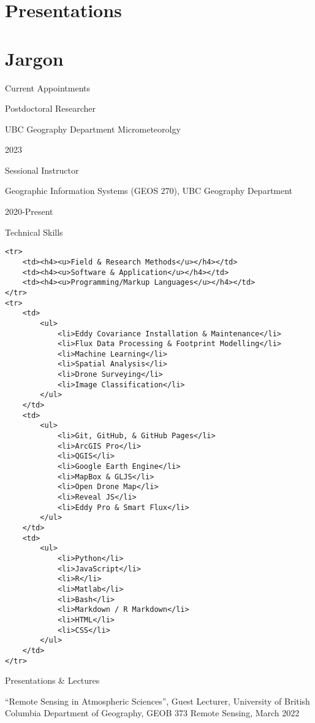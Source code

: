 \documentclass[
]{article}
\begin{document}
\hypertarget{presentations}{%
\section{Presentations}\label{presentations}}

\hypertarget{jargon}{%
\section{Jargon}\label{jargon}}

Current Appointments

Postdoctoral Researcher

UBC Geography Department Micrometeorolgy

2023

Sessional Instructor

Geographic Information Systems (GEOS 270), UBC Geography Department

2020-Present

Technical Skills

\begin{verbatim}
<tr>
    <td><h4><u>Field & Research Methods</u></h4></td>
    <td><h4><u>Software & Application</u></h4></td>
    <td><h4><u>Programming/Markup Languages</u></h4></td>
</tr>
<tr>
    <td>
        <ul>
            <li>Eddy Covariance Installation & Maintenance</li>
            <li>Flux Data Processing & Footprint Modelling</li>
            <li>Machine Learning</li>
            <li>Spatial Analysis</li>
            <li>Drone Surveying</li>
            <li>Image Classification</li>
        </ul>
    </td>
    <td>
        <ul>
            <li>Git, GitHub, & GitHub Pages</li>
            <li>ArcGIS Pro</li>
            <li>QGIS</li>
            <li>Google Earth Engine</li>
            <li>MapBox & GLJS</li>
            <li>Open Drone Map</li>
            <li>Reveal JS</li>
            <li>Eddy Pro & Smart Flux</li>
        </ul>
    </td>
    <td>
        <ul>
            <li>Python</li>
            <li>JavaScript</li>
            <li>R</li>
            <li>Matlab</li>
            <li>Bash</li>
            <li>Markdown / R Markdown</li>
            <li>HTML</li>
            <li>CSS</li>
        </ul>
    </td>   
</tr>
\end{verbatim}

Presentations \& Lectures

``Remote Sensing in Atmospheric Sciences'', Guest Lecturer, University
of British Columbia Department of Geography, GEOB 373 Remote Sensing,
March 2022
\end{document}
